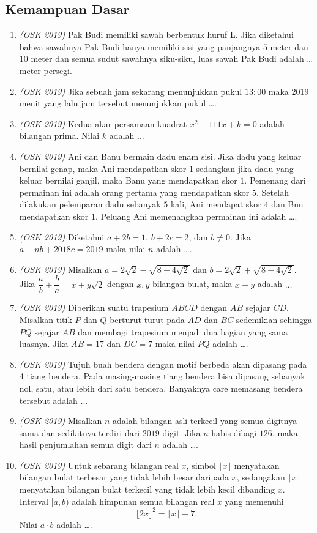 \documentclass[11pt]{scrartcl}
\begin{document}
\subsection{Kemampuan Dasar}
\begin{enumerate}
    \item \textit{(OSK 2019)} Pak Budi memiliki sawah berbentuk huruf L. Jika diketahui bahwa sawahnya Pak Budi hanya memiliki sisi yang panjangnya $5$ meter dan $10$ meter dan semua sudut sawahnya siku-siku, luas sawah Pak Budi adalah \dots meter persegi.
    \item \textit{(OSK 2019)} Jika sebuah jam sekarang menunjukkan pukul $13:00$ maka $2019$ menit yang lalu jam tersebut menunjukkan pukul \dots. 
    \item \textit{(OSK 2019)} Kedua akar persamaan kuadrat $x^2-111x+k=0$ adalah bilangan prima. Nilai $k$ adalah $\dots$
    \item \textit{(OSK 2019)} Ani dan Banu bermain dadu enam sisi. Jika dadu yang keluar bernilai genap, maka Ani mendapatkan skor $1$ sedangkan jika dadu yang keluar bernilai ganjil, maka Banu yang mendapatkan skor $1$. Pemenang dari permainan ini adalah orang pertama yang mendapatkan skor $5$. Setelah dilakukan pelemparan dadu sebanyak $5$ kali, Ani mendapat skor $4$ dan Bnu mendapatkan skor $1$. Peluang Ani memenangkan permainan ini adalah \dots.
    \item \textit{(OSK 2019)} Diketahui $a+2b=1$, $b+2c=2$, dan $b\neq 0$. Jika $a+nb+2018c=2019$ maka nilai $n$ adalah \dots.
    \item \textit{(OSK 2019)} Misalkan $a=2\sqrt{2}-\sqrt{8-4\sqrt{2}}$ dan $b=2\sqrt{2}+\sqrt{8-4\sqrt{2}}$. Jika $\dfrac{a}{b}+\dfrac{b}{a}=x+y\sqrt{2}$ dengan $x,y$ bilangan bulat, maka $x+y$ adalah $\dots$
    \item \textit{(OSK 2019)} Diberikan suatu trapesium $ABCD$ dengan $AB$ sejajar $CD$. Misalkan titik $P$ dan $Q$ berturut-turut pada $AD$ dan $BC$ sedemikian sehingga $PQ$ sejajar $AB$ dan membagi trapesium menjadi dua bagian yang sama luasnya. Jika $AB=17$ dan $DC=7$ maka nilai $PQ$ adalah \dots.
    \item \textit{(OSK 2019)} Tujuh buah bendera dengan motif berbeda akan dipasang pada 4 tiang bendera. Pada masing-masing tiang bendera bisa dipasang sebanyak nol, satu, atau lebih dari satu bendera. Banyaknya care memasang bendera tersebut adalah $\dots$
    \item \textit{(OSK 2019)} Misalkan $n$ adalah bilangan asli terkecil yang semua digitnya sama dan sedikitnya terdiri dari $2019$ digit. Jika $n$ habis dibagi $126$, maka hasil penjumlahan semua digit dari $n$ adalah \dots.
    \item \textit{(OSK 2019)} Untuk sebarang bilangan real $x$, simbol $\lfloor x\rfloor$ menyatakan bilangan bulat terbesar yang tidak lebih besar daripada $x$, sedangakan $\lceil x\rceil$ menyatakan bilangan bulat terkecil yang tidak lebih kecil dibanding $x$. Interval $[a,b)$ adalah himpunan semua bilangan real $x$ yang memenuhi
    $$\lfloor 2x\rfloor^2=\lceil x\rceil+7.$$
    Nilai $a\cdot b$ adalah \dots.
\end{enumerate}
\end{document}
